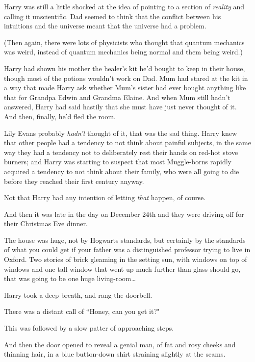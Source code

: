 Harry was still a little shocked at the idea of pointing to a section of \emph{reality} and calling it unscientific. Dad seemed to think that the conflict between his intuitions and the universe meant that the universe had a problem.

(Then again, there were lots of physicists who thought that quantum mechanics was weird, instead of quantum mechanics being normal and them being weird.)

Harry had shown his mother the healer's kit he'd bought to keep in their house, though most of the potions wouldn't work on Dad. Mum had stared at the kit in a way that made Harry ask whether Mum's sister had ever bought anything like that for Grandpa Edwin and Grandma Elaine. And when Mum still hadn't answered, Harry had said hastily that she must have just never thought of it. And then, finally, he'd fled the room.

Lily Evans probably \emph{hadn't} thought of it, that was the sad thing. Harry knew that other people had a tendency to not think about painful subjects, in the same way they had a tendency not to deliberately rest their hands on red-hot stove burners; and Harry was starting to suspect that most Muggle-borns rapidly acquired a tendency to not think about their family, who were all going to die before they reached their first century anyway.

Not that Harry had any intention of letting \emph{that} happen, of course.

And then it was late in the day on December 24th and they were driving off for their Christmas Eve dinner.

\later

The house was huge, not by Hogwarts standards, but certainly by the standards of what you could get if your father was a distinguished professor trying to live in Oxford. Two stories of brick gleaming in the setting sun, with windows on top of windows and one tall window that went up much further than glass should go, that was going to be one huge living-room{\ldots}

Harry took a deep breath, and rang the doorbell.

There was a distant call of ``Honey, can you get it?"

This was followed by a slow patter of approaching steps.

And then the door opened to reveal a genial man, of fat and rosy cheeks and thinning hair, in a blue button-down shirt straining slightly at the seams.

